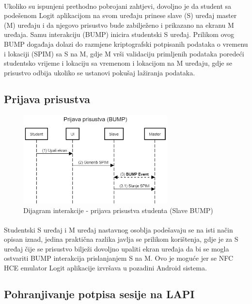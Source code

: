 \paragraph*{}
Ukoliko su ispunjeni prethodno pobrojani zahtjevi, dovoljno je da student sa podešenom Logit aplikacijom na svom uređaju prinese slave (S) uređaj master (M) uređaju i da njegovo prisustvo bude zabilježeno i prikazano na ekranu M uređaja. Samu interakciju (BUMP) inicira studentski S uređaj. Prilikom ovog BUMP događaja dolazi do razmjene kriptografski potpisanih podataka o vremenu i lokaciji (SPIM) sa S na M, gdje M vrši validaciju primljenih podataka poredeći studentsko vrijeme i lokaciju sa vremenom i lokacijom na M uređaju, gdje se prisustvo odbija ukoliko se ustanovi pokušaj lažiranja podataka.

\subsection*{Prijava prisustva}
\begin{figure}[H]
    \centering
    \includegraphics[width=0.7\textwidth]{material/dia/03_prijava}
    \caption{Dijagram interakcije - prijava prisustva studenta (Slave BUMP)}
\end{figure}
\paragraph*{}
Studentski S uređaj i M uređaj nastavnog osoblja podešavaju se na isti način opisan iznad, jedina praktična razlika javlja se prilikom korištenja, gdje je za S uređaj čije se prisustvo bilježi dovoljno upaliti ekran uređaja da bi se mogla ostvariti BUMP interakcija prislanjanjem S na M. Ovo je moguće jer se NFC HCE emulator Logit aplikacije izvršava u pozadini Android sistema.

\subsection*{Pohranjivanje potpisa sesije na LAPI}
